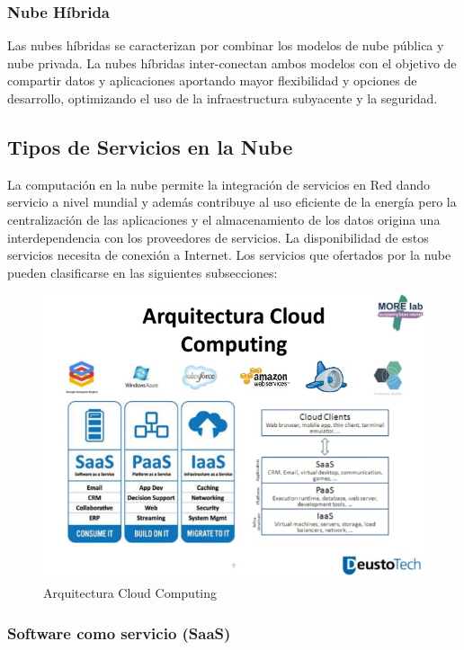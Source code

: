 \documentclass[a4paper,11pt]{book}
\begin{document}
\subsubsection{Nube Híbrida}

Las nubes híbridas se caracterizan por combinar los modelos de nube pública y nube privada. La nubes híbridas inter-conectan ambos modelos con el objetivo de compartir datos y aplicaciones aportando mayor flexibilidad y opciones de desarrollo, optimizando el uso de la infraestructura subyacente y la seguridad.   


\subsection{Tipos de Servicios en la Nube}

La computación en la nube permite la integración de servicios en Red dando servicio a nivel mundial y además contribuye al uso eficiente de la energía pero la centralización de las aplicaciones y el almacenamiento de los datos origina una interdependencia con los proveedores de servicios. La disponibilidad de estos servicios necesita de conexión a Internet. Los servicios que ofertados por la nube pueden clasificarse en las siguientes subsecciones: 

\begin{figure}[H] 
\centering 
\includegraphics[scale=0.5]{imagenes/arquitecturaCC.jpg}
\caption{ Arquitectura Cloud Computing\cite{arquitecturaCC} }
\end{figure}

\subsubsection{Software como servicio (SaaS)}
\end{document}
